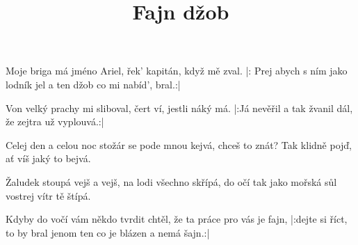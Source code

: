 \beginsong

\title{Fajn džob}

\beginverse
Moje briga má jméno Ariel,
řek' kapitán, když mě zval.
|: Prej abych s ním jako lodník jel
a ten džob co mi nabíd', bral.:|{}
\endverse

\beginverse
Von velký prachy mi sliboval,
čert ví, jestli náký má.
|:Já nevěřil a tak žvanil dál,
že zejtra už vyplouvá.:|{}
\endverse

\beginverse
Celej den a celou noc
stožár se pode mnou kejvá,
chceš to znát? Tak klidně pojď,
ať víš jaký to bejvá.

Žaludek stoupá vejš a vejš,
na lodi všechno skřípá,
do očí tak jako mořská sůl
vostrej vítr tě štípá.
\endverse

\beginverse
Kdyby do vočí vám někdo tvrdit chtěl,
že ta práce pro vás je fajn,
|:dejte si říct, to by bral jenom ten
co je blázen a nemá šajn.:|{}
\endverse



